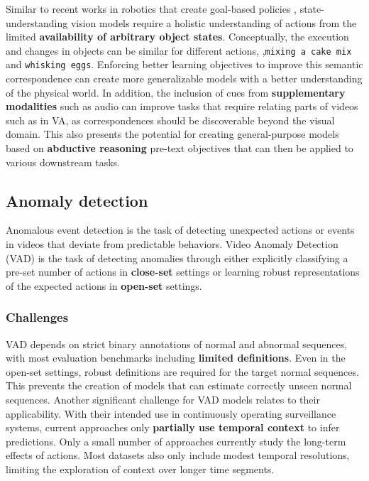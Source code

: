 Similar to recent works in robotics that create goal-based policies \citep{kununi2024uni,wang2023manipulate}, state-understanding vision models require a holistic understanding of actions from the limited \textbf{availability of arbitrary object states}. Conceptually, the execution and changes in objects can be similar for different actions, \eg,\texttt{mixing a cake mix} and \texttt{whisking eggs}. Enforcing better learning objectives to improve this semantic correspondence can create more generalizable models with a better understanding of the physical world. In addition, the inclusion of cues from \textbf{supplementary modalities} such as audio can improve tasks that require relating parts of videos such as in VA, as correspondences should be discoverable beyond the visual domain. This also presents the potential for creating general-purpose models based on \textbf{abductive reasoning} pre-text objectives that can then be applied to various downstream tasks.



\subsection{Anomaly detection}

Anomalous event detection is the task of detecting unexpected actions or events in videos that deviate from predictable behaviors. Video Anomaly Detection (VAD) is the task of detecting anomalies through either explicitly classifying a pre-set number of actions in \textbf{close-set} settings or learning robust representations of the expected actions in \textbf{open-set} settings.


\subsubsection{Challenges}

VAD depends on strict binary annotations of normal and abnormal sequences, with most evaluation benchmarks including \textbf{limited definitions}. Even in the open-set settings, robust definitions are required for the target normal sequences. This prevents the creation of models that can estimate correctly unseen normal sequences. Another significant challenge for VAD models relates to their applicability. With their intended use in continuously operating surveillance systems, current approaches only \textbf{partially use temporal context} to infer predictions. Only a small number of approaches currently study the long-term effects of actions. Most datasets also only include modest temporal resolutions, limiting the exploration of context over longer time segments.



